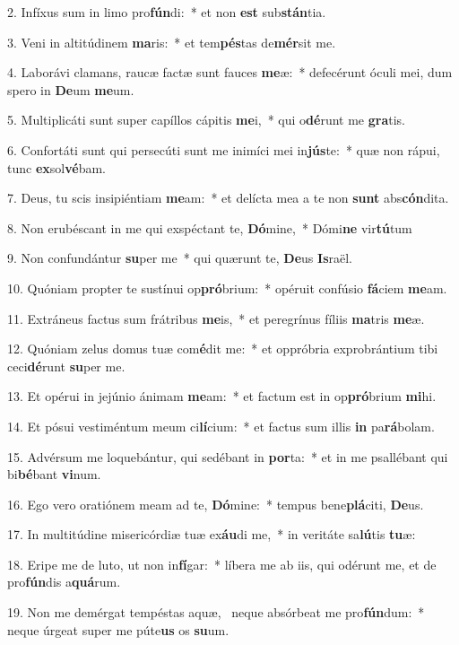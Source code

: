 2. Infíxus sum in limo pro\textbf{fún}di:~*  et non \textbf{est} sub\textbf{stán}tia.\

3. Veni in altitúdinem \textbf{ma}ris:~*  et tem\textbf{pés}tas de\textbf{mér}sit me.\

4. Laborávi clamans, raucæ factæ sunt fauces \textbf{me}æ:~*  defecérunt óculi mei, dum spero in \textbf{De}um \textbf{me}um.\

5. Multiplicáti sunt super capíllos cápitis \textbf{me}i,~*  qui o\textbf{dé}runt me \textbf{gra}tis.\

6. Confortáti sunt qui persecúti sunt me inimíci mei in\textbf{jús}te:~*  quæ non rápui, tunc \textbf{ex}sol\textbf{vé}bam.\

7. Deus, tu scis insipiéntiam \textbf{me}am:~*  et delícta mea a te non \textbf{sunt} abs\textbf{cón}dita.\

8. Non erubéscant in me qui exspéctant te, \textbf{Dó}mine,~*  Dómi\textbf{ne} vir\textbf{tú}tum\

9. Non confundántur \textbf{su}per me~*  qui quærunt te, \textbf{De}us \textbf{Is}raël.\

10. Quóniam propter te sustínui op\textbf{pró}brium:~*  opéruit confúsio \textbf{fá}ciem \textbf{me}am.\

11. Extráneus factus sum frátribus \textbf{me}is,~*  et peregrínus fíliis \textbf{ma}tris \textbf{me}æ.\

12. Quóniam zelus domus tuæ com\textbf{é}dit me:~*  et oppróbria exprobrántium tibi ceci\textbf{dé}runt \textbf{su}per me.\

13. Et opérui in jejúnio ánimam \textbf{me}am:~*  et factum est in op\textbf{pró}brium \textbf{mi}hi.\

14. Et pósui vestiméntum meum ci\textbf{lí}cium:~*  et factus sum illis \textbf{in} pa\textbf{rá}bolam.\

15. Advérsum me loquebántur, qui sedébant in \textbf{por}ta:~*  et in me psallébant qui bi\textbf{bé}bant \textbf{vi}num.\

16. Ego vero oratiónem meam ad te, \textbf{Dó}mine:~*  tempus bene\textbf{plá}citi, \textbf{De}us.\

17. In multitúdine misericórdiæ tuæ ex\textbf{áu}di me,~*  in veritáte sa\textbf{lú}tis \textbf{tu}æ:\

18. Eripe me de luto, ut non in\textbf{fí}gar:~*  líbera me ab iis, qui odérunt me, et de pro\textbf{fún}dis a\textbf{quá}rum.\

19. Non me demérgat tempéstas aquæ, \dag\  neque absórbeat me pro\textbf{fún}dum:~*  neque úrgeat super me púte\textbf{us} os \textbf{su}um.\

